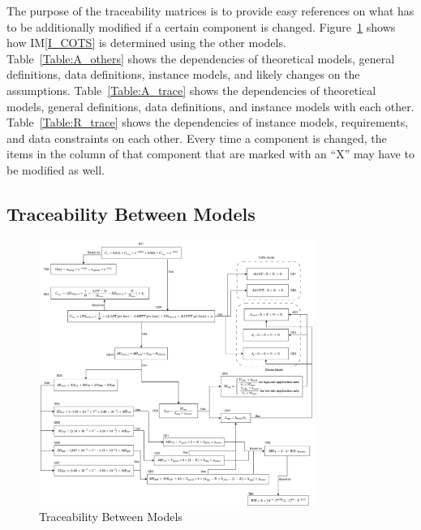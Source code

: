 \documentclass[12pt]{article}
\newcommand{\iref}[1]{IM\ref{#1}}
\begin{document}
The purpose of the traceability matrices is to provide easy references on what
has to be additionally modified if a certain component is changed.  Figure~\ref{Fig_TraceabilityBetweenModels} shows how \iref{I_COTS} is determined using the other models.
\\
Table~\ref{Table:A_others} shows the dependencies of theoretical models, general definitions, data definitions, instance models, and likely changes on the assumptions. Table~\ref{Table:A_trace} shows the dependencies of theoretical models, general definitions, data definitions, and instance models with each other. Table~\ref{Table:R_trace} shows the dependencies of instance models, requirements, and data constraints on each other. Every time a component is changed, the items in the column of that component that are marked
with an ``X'' may have to be modified as well. 

\subsection{Traceability Between Models}
\begin{figure}[h!]
\begin{center}
 \includegraphics[width=0.8\textwidth]{TraceabilityBetweenModels}
\caption{Traceability Between Models}
\label{Fig_TraceabilityBetweenModels} 
\end{center}
\end{figure}
\end{document}
